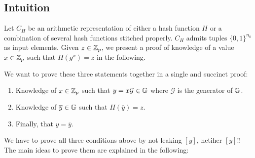 \subsection{Intuition}

Let $C_H$ be an arithmetic representation of either a hash function $H$ or a combination of several hash functions stitched properly. $C_H$ admits tuples $\{0,1\}^{n_0}$ as input elements. 
Given $z \in \mathbb{Z}_p$, we present a proof of knowledge of a value $x\in \mathbb{Z}_p$ such that $H(g^x)=z$ in the following.

We want to prove these three statements together in a single and succinct proof:
\begin{enumerate}
	\item Knowledge of $x \in \mathbb{Z}_p$ such that $y=x \mathcal{G}\in \mathbb{G}$ where $\mathcal{G}$ is the generator of $\mathbb{G}$. 
	\item Knowledge of $\overline{y} \in \mathbb{G}$ such that $H(\overline{y})=z$. 
	\item Finally, that $y=\overline{y}$.
\end{enumerate}
We have to prove all three conditions above by not leaking $[y]$, netiher $[\overline{y}]$!! The main ideas to prove them are explained in the following:
